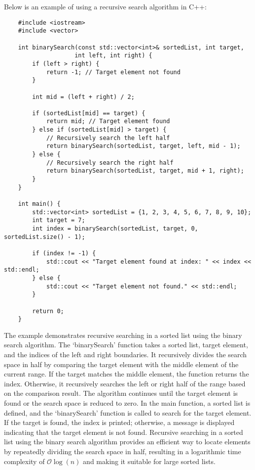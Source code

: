\begin{solution}
    Below is an example of using a recursive search algorithm in C++:

    \horizontalline

    \begin{verbatim}
    #include <iostream>
    #include <vector>
    
    int binarySearch(const std::vector<int>& sortedList, int target, 
                    int left, int right) {
        if (left > right) {
            return -1; // Target element not found
        }
    
        int mid = (left + right) / 2;
    
        if (sortedList[mid] == target) {
            return mid; // Target element found
        } else if (sortedList[mid] > target) {
            // Recursively search the left half
            return binarySearch(sortedList, target, left, mid - 1);
        } else {
            // Recursively search the right half
            return binarySearch(sortedList, target, mid + 1, right);
        }
    }
    
    int main() {
        std::vector<int> sortedList = {1, 2, 3, 4, 5, 6, 7, 8, 9, 10};
        int target = 7;
        int index = binarySearch(sortedList, target, 0, sortedList.size() - 1);
    
        if (index != -1) {
            std::cout << "Target element found at index: " << index << std::endl;
        } else {
            std::cout << "Target element not found." << std::endl;
        }
    
        return 0;
    }
    \end{verbatim}

    \horizontalline

    The example demonstrates recursive searching in a sorted list using the binary search algorithm. The `binarySearch' function takes a sorted list, target element, and the indices of the left and right boundaries. It recursively divides the search space in half by comparing the target element with the 
    middle element of the current range. If the target matches the middle element, the function returns the index. Otherwise, it recursively searches the left or right half of the range based on the comparison result. The algorithm continues until the target element is found or the search space is reduced 
    to zero. In the main function, a sorted list is defined, and the `binarySearch' function is called to search for the target element. If the target is found, the index is printed; otherwise, a message is displayed indicating that the target element is not found. Recursive searching in a sorted list using 
    the binary search algorithm provides an efficient way to locate elements by repeatedly dividing the search space in half, resulting in a logarithmic time complexity of $\mathcal{O}\log{(n)}$ and making it suitable for large sorted lists.
\end{solution}

